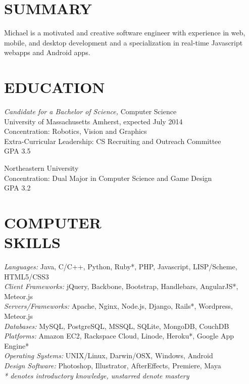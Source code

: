 \documentclass[line,margin]{res}
\begin{document}
\address{169F Brittany Mnr, Amherst, MA 01002}
\address{(781) 264-6283  --  mike@miketurley.com}

 
\begin{resume}
 
\section{SUMMARY}       Michael is a motivated and creative software engineer with experience in web, mobile, and desktop development and a specialization in real-time Javascript webapps and Android apps.
 
 
\section{EDUCATION} {\sl Candidate for a Bachelor of Science,} Computer Science \\
                University of Massachusetts Amherst, 
                expected July 2014 \\
                Concentration: Robotics, Vision and Graphics \\
                Extra-Curricular Leadership: CS Recruiting and Outreach Committee \\
                GPA 3.5
                
                Northeastern University \\
                Concentration: Dual Major in Computer Science and Game Design \\
                GPA 3.2
 
 
\section{COMPUTER \\ SKILLS} {\sl Languages:} Java, C/C++, Python,
                Ruby*, PHP, Javascript, LISP/Scheme, HTML5/CSS3 \\
                {\sl Client Frameworks:} jQuery, Backbone, Bootstrap, Handlebars, AngularJS*, Meteor.js \\
                {\sl Servers/Frameworks:} Apache, Nginx, Node.js, Django,
                Rails*, Wordpress, Meteor.js \\
                {\sl Databases:} MySQL, PostgreSQL, MSSQL, SQLite, MongoDB, CouchDB \\
                {\sl Platforms:} Amazon EC2, Rackspace Cloud, Linode, Heroku*, Google App Engine* \\
                {\sl Operating Systems:} UNIX/Linux, Darwin/OSX, Windows, Android \\
                {\sl Design Software:} Photoshop, Illustrator, AfterEffects, Premiere, Maya \\
                {\footnotesize {\sl \** denotes introductory knowledge, unstarred denote mastery}}
 

\end{resume}
\end{document}

